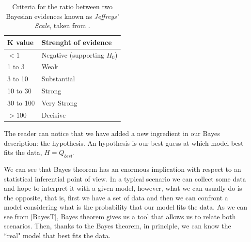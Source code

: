 \documentclass[onecolumn,           %
               showpacs,            %
               preprintnumbers,     %
               aps,                 %
               letterpaper,             %
               superscriptaddress,      %
               nofootinbib,         %
               tightenlines,        %
               floats,floatfix      %
               ,usenatbib,
               ]{revtex4-1}
\begin{document}
\begin{table}[h!]
\centering
\begin{tabular}{||l|l||} 
 \hline
 \textbf{K value} & \textbf{Strenght of evidence} \\ [0.5ex] 
 \hline\hline
 $<1$  & Negative (supporting $H_0$)   \\ 
 \hline
 1 to 3 & Weak \\
 \hline 
3 to 10 & Substantial\\
\hline
10 to 30 & Strong\\
\hline
30 to 100 & Very Strong \\
\hline
$>100$ & Decisive\\ [1ex] 
 \hline
\end{tabular}
\caption{Criteria for the ratio between two Bayesian evidences known as \textit{Jeffreys' Scale}, taken from \cite{hiperp2}.}
\label{evidence}
\end{table}
The reader can notice that we have added a new ingredient in our Bayes description: the hypothesis. An hypothesis is our best guess at which model best fits the data, $H=Q_{best}$.

We can see that Bayes theorem has an enormous implication with respect to an statistical inferential point of view. In a typical scenario we can collect some data and hope to interpret it with a given model, however, what we can usually do is the opposite, that is, first we have a set of data and then we can confront a model considering what is the probability that our model fits the data. As we can see from \eqref{BayesT}, Bayes theorem gives us a tool that allows us to relate both scenarios. Then, thanks to the Bayes theorem, in principle, we can know the ``real" model that best fits the data.
\end{document}
